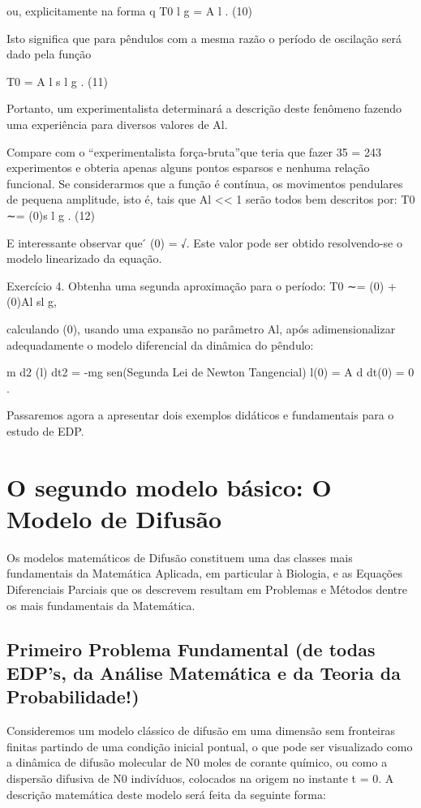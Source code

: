 ou, explicitamente na forma
q
T0
l
g
= \Phi
A
l
. (10)

Isto significa que para pêndulos com a mesma razão o período de oscilação será dado pela função

T0 = \Phi
A
l
 s
l
g
. (11)

Portanto, um experimentalista determinará a descrição deste fenômeno fazendo uma experiência para diversos valores de Al.

Compare com o “experimentalista força-bruta”que teria que fazer 35 = 243 experimentos e obteria apenas alguns pontos esparsos e nenhuma relação funcional. Se considerarmos que a função \Phi é contínua, os movimentos pendulares de pequena amplitude, isto é, tais que Al << 1 serão todos bem descritos por:
T0
∼= \Phi(0)s
l
g
. (12)

E interessante observar que  ́ \Phi(0) = √\pi. Este valor pode ser obtido resolvendo-se o modelo linearizado da equação.

Exercício 4. Obtenha uma segunda aproximação para o período:
T0
∼=
\Phi(0) + (0)Al sl g,

calculando (0), usando uma expansão no parâmetro Al, após adimensionalizar adequadamente o modelo diferencial da dinâmica do pêndulo:

m d2
(l\theta)
dt2
= -mg sen\theta (Segunda Lei de Newton Tangencial)
l\theta(0) = A
d\theta
dt(0) = 0 .

Passaremos agora a apresentar dois exemplos didáticos e fundamentais para o estudo de EDP.

\section{O segundo modelo básico: O Modelo de Difusão}

Os modelos matemáticos de Difusão constituem uma das classes mais fundamentais da Matemática Aplicada, em particular à Biologia, e as Equações Diferenciais Parciais que os descrevem resultam em Problemas e Métodos dentre os mais fundamentais da
Matemática.

\subsection{Primeiro Problema Fundamental (de todas EDP’s, da Análise Matemática e da Teoria da Probabilidade!)}

Consideremos um modelo clássico de difusão em uma dimensão sem fronteiras finitas partindo de uma condição inicial pontual, o que pode ser visualizado como a dinâmica de difusão molecular de N0 moles de corante químico, ou como a dispersão difusiva de N0 indivíduos, colocados na origem no instante t = 0. A descrição matemática deste modelo será feita da seguinte forma:


